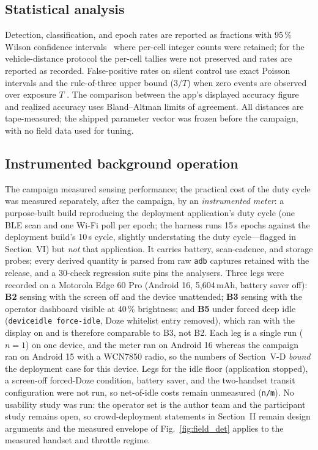 \documentclass[journal,10pt]{IEEEtran}
\begin{document}
\subsection{Statistical analysis}
Detection, classification, and epoch rates are reported as fractions with
95\,\% Wilson confidence intervals~\cite{Brown20183Wilson} where per-cell
integer counts were retained; for the vehicle-distance protocol the per-cell
tallies were not preserved and rates are reported as recorded. False-positive
rates on silent control use exact Poisson intervals and the rule-of-three
upper bound ($3/T$) when zero events are observed over exposure $T$
\cite{Hanley1983RuleOfThree}. The comparison between the app's displayed
accuracy figure and realized accuracy uses Bland--Altman limits of agreement.
All distances are tape-measured; the shipped parameter vector was frozen
before the campaign, with no field data used for tuning.

\subsection{Instrumented background operation}
\label{sec:background}
The campaign measured sensing performance; the practical cost of the duty
cycle was measured separately, after the campaign, by an \emph{instrumented
meter}: a purpose-built build reproducing the deployment application's duty
cycle (one BLE scan and one Wi-Fi poll per epoch; the harness runs 15\,s
epochs against the deployment build's 10\,s cycle, slightly understating the
duty cycle---flagged in Section~VI) but \emph{not} that application. It
carries battery, scan-cadence, and storage probes; every derived quantity is
parsed from raw \texttt{adb} captures retained with the release, and a
30-check regression suite pins the analysers. Three legs were recorded on a
Motorola Edge 60 Pro (Android 16, 5{,}604\,mAh, battery saver off):
\textbf{B2} sensing with the screen off and the device unattended;
\textbf{B3} sensing with the operator dashboard visible at 40\,\% brightness;
and \textbf{B5} under forced deep idle (\texttt{deviceidle force-idle}, Doze
whitelist entry removed), which ran with the display on and is therefore
comparable to B3, not B2. Each leg is a single run ($n=1$) on one device, and
the meter ran on Android 16 whereas the campaign ran on Android 15 with a
WCN7850 radio, so the numbers of Section~V-D \emph{bound} the deployment case
for this device. Legs for the idle floor (application stopped), a screen-off
forced-Doze condition, battery saver, and the two-handset transit
configuration were not run, so net-of-idle costs remain unmeasured
(\texttt{n/m}). No usability study was run: the operator set is the author
team and the participant study remains open, so crowd-deployment
statements in Section~II remain design arguments and the measured envelope of
Fig.~\ref{fig:field_det} applies to the measured handset and throttle regime.
\end{document}
